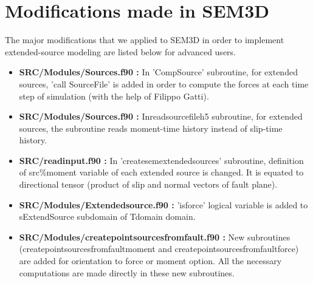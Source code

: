 \chapter{Modifications made in SEM3D}
\label{chapmodi}
The major modifications that we applied to SEM3D in order to implement extended-source modeling are listed below for advanced users.

\begin{itemize}


\item \textbf{SRC/Modules/Sources.f90 :} In 'CompSource' subroutine, for extended sources, 'call Source\textunderscore File' is added in order to compute the forces at each time step of simulation (with the help of Filippo Gatti).\\

\item \textbf{SRC/Modules/Sources.f90 :} Inread\textunderscore source\textunderscore file\textunderscore h5 subroutine, for extended sources, the subroutine reads moment-time history instead of slip-time history.\\

\item \textbf{SRC/read\textunderscore input.f90 :} In 'create\textunderscore sem\textunderscore extended\textunderscore sources' subroutine, definition of src\%moment variable of each extended source is changed. It is equated to directional tensor (product of slip and normal vectors of fault plane). \\


\item \textbf{SRC/Modules/Extended\textunderscore source.f90 :} 'is\textunderscore force' logical variable is added to sExtendSource subdomain of Tdomain domain.  \\

\item \textbf{SRC/Modules/create\textunderscore point\textunderscore sources\textunderscore from\textunderscore fault.f90 :} New subroutines \\ (create\textunderscore point\textunderscore sources\textunderscore from\textunderscore fault\textunderscore moment and create\textunderscore point\textunderscore sources\textunderscore from\textunderscore fault\textunderscore force) are added for orientation to force or moment option.  All the necessary computations are made directly in these new subroutines. \\


\end{itemize}
 













 